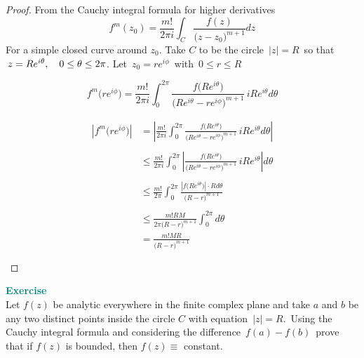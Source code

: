 \documentclass[11pt,a4paper]{article}
\theoremstyle{definition}
\begin{document}
\begin{proof}
From the Cauchy integral formula for higher derivatives
$$f^m(z_0) = \frac{m!}{2\pi i}\int_C\frac{f(z)}{\big(z - z_0\big)^{m + 1}}dz$$
For a simple closed curve around $z_0$. Take $C$ to be the circle $\,\left|z\right| = R\,$ so that $\, z = Re^{i\theta},\\ \quad  0\leq \theta \leq 2\pi$. Let $\, z_0 = re^{i\phi}\,$ with $\, 0\leq r \leq R$

$$f^m\big(re^{i\phi}\big) = \frac{m!}{2\pi i}\int^{2\pi}_0 \frac{f\big(Re^{i\theta}\big)}{\big(Re^{i\theta} - re^{i\phi}\big)^{m+1}}\,iRe^{i\theta}d\theta$$

\begin{align*}
\left|f^m\big(re^{i\phi}\big)\right| & = \left|\frac{m!}{2\pi i}\displaystyle{\int^{2\pi}_0 }\frac{f\big(Re^{i\theta}\big)}{\big(Re^{i\theta} - re^{i\phi}\big)^{m+1}}\,iRe^{i\theta}d\theta\right|\\\\
& \leq  \frac{m!}{2\pi i}\int^{2\pi}_0\left|\frac{f\big(Re^{i\theta}\big)}{\big(Re^{i\theta} - re^{i\phi}\big)^{m+1}}\,iRe^{i\theta}\right|d\theta\\\\
& \leq \frac{m!}{2\pi }\int^{2\pi}_0\frac{\left|f\big(Re^{i\theta}\big)\right| \cdot R d\theta}{\big(R - r\big)^{m + 1}}\\\\
& \leq \frac{m! RM}{2\pi \big(R - r\big)^{m + 1}}\int^{2\pi}_0d\theta\\
& = \frac{m! MR}{\big(R - r\big)^{m + 1}}\\\\
\end{align*}
\end{proof}

\textbf{\textcolor{teal}{Exercise}}\\
Let $f(z)$ be analytic everywhere in the finite complex plane and take $a$ and $b$ be any two distinct points inside the circle $C$ with equation $\,\left|z\right| = R.\,$ Using the Cauchy integral formula and considering the difference $\,f(a) - f(b)\,$ prove that if $f(z)$ is bounded, then $f(z) \equiv$ constant.\\\\
\end{document}
